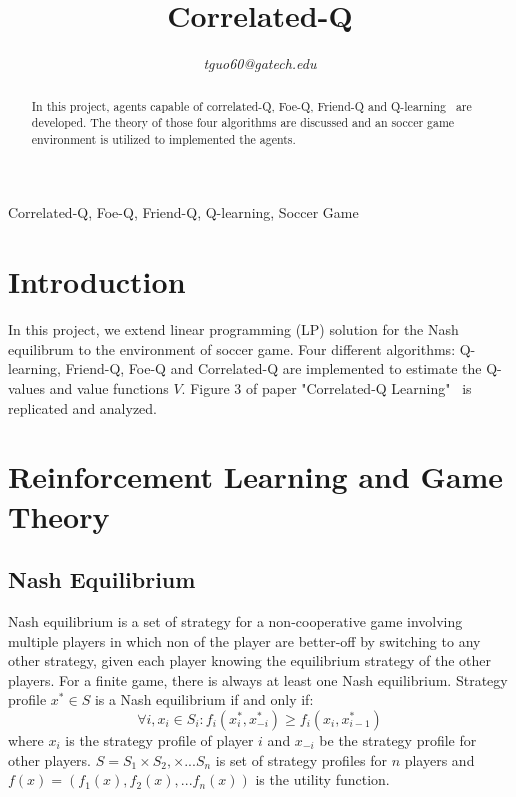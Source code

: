 \documentclass[conference]{IEEEtran}
\title{Correlated-Q\\
}
\begin{document}



\author{
\textit{tguo60@gatech.edu}
}

\maketitle

\thispagestyle{firstpage}

\begin{abstract}
In this project, agents capable of correlated-Q, Foe-Q, Friend-Q and Q-learning~\cite{b1} are developed. The theory of those four algorithms are discussed and an soccer game environment is utilized to implemented the agents. 
\end{abstract}

\begin{IEEEkeywords}
Correlated-Q, Foe-Q, Friend-Q, Q-learning, Soccer Game
\end{IEEEkeywords}

\section{Introduction}

In this project, we extend linear programming (LP) solution for the Nash equilibrum to the environment of soccer game. Four different algorithms: Q-learning, Friend-Q, Foe-Q and Correlated-Q are implemented to estimate the Q-values and value functions $V$. Figure 3 of paper "Correlated-Q Learning"~\cite{b1} is replicated and analyzed.

\section{Reinforcement Learning and Game Theory}

\subsection{Nash Equilibrium}

Nash equilibrium is a set of strategy for a non-cooperative game involving multiple players in which non of the player are better-off by switching to any other strategy, given each player knowing the equilibrium strategy of the other players. For a finite game, there is always at least one Nash equilibrium. Strategy profile $x^* \in S$ is a Nash equilibrium if and only if:
\begin{equation}\label{eq:equilibrium}
\forall i, x_i \in S_i: f_i(x_i^*,x_{-i}^*) \geq f_i(x_i,x_{i-1}^*)
\end{equation}
where $x_i$ is the strategy profile of player $i$ and $x_{-i}$ be the strategy profile for other players. $S = S_1 \times S_2, \times...S_n$ is set of strategy profiles for $n$ players and $f(x) = (f_1(x),f_2(x),...f_n(x))$ is the utility function. 
\end{document}
